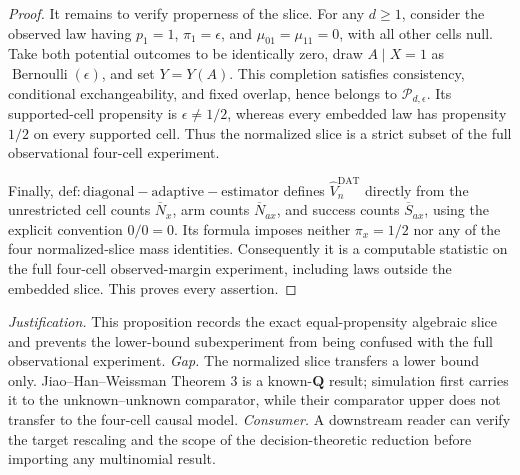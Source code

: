 \documentclass{article}
\begin{document}
\begin{proof}
It remains to verify properness of the slice.  For any \(d\ge1\), consider the observed law having \(p_1=1\), \(\pi_1=\epsilon\), and \(\mu_{01}=\mu_{11}=0\), with all other cells null.  Take both potential outcomes to be identically zero, draw \(A\mid X=1\) as \(\operatorname{Bernoulli}(\epsilon)\), and set \(Y=Y(A)\).  This completion satisfies consistency, conditional exchangeability, and fixed overlap, hence belongs to \(\mathcal P_{d,\epsilon}\).  Its supported-cell propensity is \(\epsilon\ne1/2\), whereas every embedded law has propensity \(1/2\) on every supported cell.  Thus the normalized slice is a strict subset of the full observational four-cell experiment.

Finally, \(\mathrm{def:diagonal-adaptive-estimator}\) defines \(\widehat V_n^{\mathrm{DAT}}\) directly from the unrestricted cell counts \(\overline N_x\), arm counts \(\overline N_{ax}\), and success counts \(\overline S_{ax}\), using the explicit convention \(0/0=0\).  Its formula imposes neither \(\pi_x=1/2\) nor any of the four normalized-slice mass identities.  Consequently it is a computable statistic on the full four-cell observed-margin experiment, including laws outside the embedded slice.  This proves every assertion.
\end{proof}
\par\smallskip\noindent \textit{Justification.} This proposition records the exact equal-propensity algebraic slice and prevents the lower-bound subexperiment from being confused with the full observational experiment. \textit{Gap.} The normalized slice transfers a lower bound only. Jiao--Han--Weissman Theorem 3 is a known-\(\mathbf Q\) result; simulation first carries it to the unknown--unknown comparator, while their comparator upper does not transfer to the four-cell causal model. \textit{Consumer.} A downstream reader can verify the target rescaling and the scope of the decision-theoretic reduction before importing any multinomial result.
\end{document}
